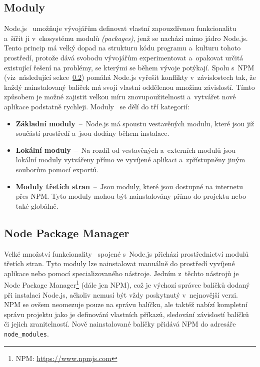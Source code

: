 \subsection{Moduly}
Node.js~\cite{book:NodeJSDesignPatterns} umožňuje vývojářům definovat vlastní zapouzdřenou funkcionalitu a~šířit ji v~ekosystému modulů \emph{(packages)}, jenž se nachází mimo jádro Node.js. Tento princip má velký dopad na strukturu kódu programu a~kulturu tohoto prostředí, protože dává svobodu vývojářům experimentovat a~opakovat určitá existující řešení na problémy, se kterými se během vývoje potýkají. Spolu s~NPM (viz~následující sekce~\ref{sec:NPM}) pomáhá Node.js vyřešit konflikty v~závislostech tak, že každý nainstalovaný balíček má svoji vlastní oddělenou množinu závislostí. Tímto způsobem je možné zajistit velkou míru znovupoužitelnosti a~vytvářet nové aplikace podstatně rychleji. Moduly~\cite{website:NodeModules} se dělí do tří kategorií:
\begin{itemize}
    \item \textbf{Základní moduly}~--~Node.js má spoustu vestavěných modulu, které jsou již součástí prostředí a~jsou dodány během instalace.
    \item \textbf{Lokální moduly}~--~Na rozdíl od vestavěných a~externích modulů jsou lokální moduly vytvářeny přímo ve vyvíjené aplikaci a~zpřístupněny jiným souborům pomocí exportů.
    \item \textbf{Moduly třetích stran}~--~Jsou moduly, které jsou dostupné na internetu přes NPM. Tyto moduly mohou být nainstalovány přímo do projektu nebo také globálně.
\end{itemize}

\subsection{Node Package Manager}
\label{sec:NPM}
Velké množství funkcionality~\cite{book:LearningNode} spojené s~Node.js přichází prostřednictví modulů třetích stran. Tyto moduly lze nainstalovat manuálně do prostředí vyvíjené aplikace nebo pomocí specializovaného nástroje. Jedním z~těchto nástrojů je Node Package Manager\footnote{NPM: \url{https://www.npmjs.com}} (dále jen NPM), což je výchozí správce balíčků dodaný při instalaci Node.js, ačkoliv nemusí být vždy poskytnutý v~nejnovější verzi. NPM se ovšem neomezuje pouze na správu balíčku, ale taktéž nabízí kompletní správu projektu jako je definování vlastních příkazů, sledování závislostí balíčků či jejich zranitelností. Nově nainstalované balíčky přidává NPM do adresáře \texttt{node\_modules}.

